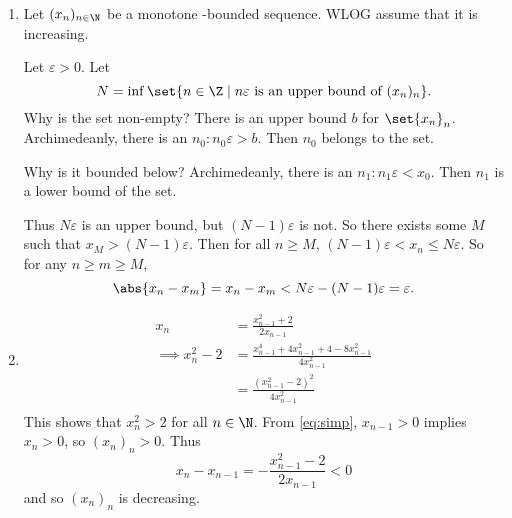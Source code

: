 \documentclass[12pt]{article}
\begin{document}
\begin{solution}
    \begin{enumerate}[label=(\arabic*)]
        \item Let $(x_n)_{n \in \N}$ be a monotone \Q-bounded sequence.
        WLOG assume that it is increasing.

        Let $\varepsilon > 0$.
        Let \[
            N = \inf\set{n \in \Z \mid n\varepsilon \text{ is an upper
            bound of } (x_n)_n}.
        \]
        Why is the set non-empty?
        There is an upper bound $b$ for $\set{x_n}_n$.
        Archimedeanly, there is an $n_0 : n_0\varepsilon > b$.
        Then $n_0$ belongs to the set.

        Why is it bounded below?
        Archimedeanly, there is an $n_1 : n_1\varepsilon < x_0$.
        Then $n_1$ is a lower bound of the set.

        Thus $N \varepsilon$ is an upper bound, but $(N-1)\varepsilon$
        is not.
        So there exists some $M$ such that $x_M > (N-1)\varepsilon$.
        Then for all $n \ge M$, $(N-1)\varepsilon < x_n \le N\varepsilon$.
        So for any $n \ge m \ge M$, \[
            \abs{x_n - x_m} = x_n - x_m
                      < N\varepsilon - (N-1)\varepsilon
                      = \varepsilon.
        \]
        \item \begin{align*}
            x_n &= \frac{x_{n-1}^2 + 2}{2x_{n-1}}
                \tag{$*$} \label{eq:simp} \\
            \implies x_n^2 - 2 &= \frac{x_{n-1}^4 + 4 x_{n-1}^2 + 4 - 8x_{n-1}^2}{4x_{n-1}^2} \\
                &= \frac{(x_{n-1}^2 - 2)^2}{4x_{n-1}^2} \\
        \end{align*}
        This shows that $x_n^2 > 2$ for all $n \in \N$.
        From \eqref{eq:simp}, $x_{n-1} > 0$ implies $x_n > 0$, so
        $(x_n)_n > 0$.
        Thus \[
            x_n - x_{n-1} = -\frac{x_{n-1}^2 - 2}{2x_{n-1}} < 0
        \] and so $(x_n)_n$ is decreasing.


\end{enumerate}
\end{solution}
\end{document}
